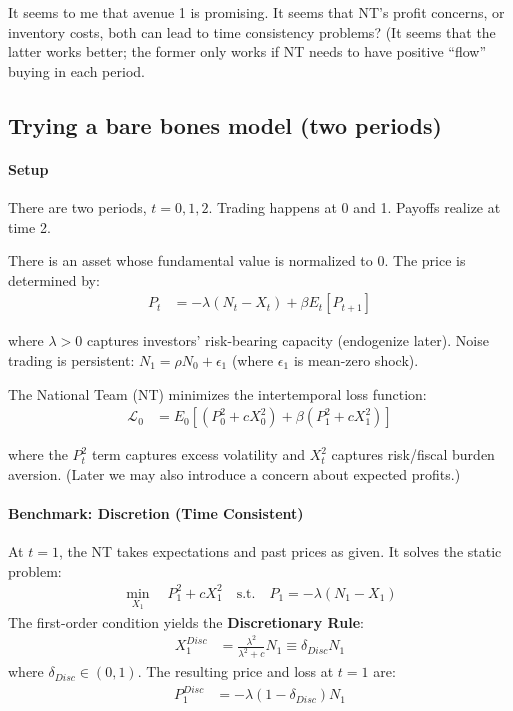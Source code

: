 \documentclass[12pt]{article}
\begin{document}
It seems to me that avenue 1 is promising. It seems that NT's profit concerns, or inventory costs, both can lead to time consistency problems? (It seems that the latter works better; the former only works if NT needs to have positive ``flow'' buying in each period. 

\subsection{Trying a bare bones model (two periods)}

\paragraph{Setup}
There are two periods, $t=0,1,2$. Trading happens at 0 and 1. Payoffs realize at time 2.

There is an asset whose fundamental value is normalized to 0. The price is determined by:
\begin{align}
    P_t &= -\lambda (N_t - X_t) + \beta E_t[P_{t+1}]
\end{align}

\noindent where $\lambda > 0$ captures investors' risk-bearing capacity (endogenize later). Noise trading is persistent: $N_1 = \rho N_0 + \epsilon_1$ (where $\epsilon_1$ is mean-zero shock).

The National Team (NT) minimizes the intertemporal loss function:
\begin{align}
    \mathcal{L}_0 &= E_0 \left[ (P_0^2 + c X_0^2) + \beta (P_1^2 + c X_1^2) \right]
\end{align}

\noindent where the $P_t^2$ term captures excess volatility and $X_t^2$ captures risk/fiscal burden aversion. (Later we may also introduce a concern about expected profits.)

\paragraph{Benchmark: Discretion (Time Consistent)}
At $t=1$, the NT takes expectations and past prices as given. It solves the static problem:
\begin{align}
    \min_{X_1} \quad P_1^2 + c X_1^2 \quad \text{s.t.} \quad P_1 = -\lambda (N_1 - X_1)
\end{align}
The first-order condition yields the \textbf{Discretionary Rule}:
\begin{align}
    X_1^{Disc} &= \frac{\lambda^2}{\lambda^2 + c} N_1 \equiv \delta_{Disc} N_1
\end{align}
where $\delta_{Disc} \in (0,1)$. The resulting price and loss at $t=1$ are:
\begin{align}
    P_1^{Disc} &= -\lambda (1 - \delta_{Disc}) N_1
\end{align}
\end{document}
